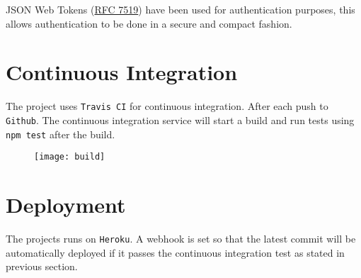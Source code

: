 \documentclass[a4paper]{article}
\begin{document}
JSON Web Tokens (\href{https://tools.ietf.org/html/rfc7519}{RFC 7519}) have
been used for authentication purposes, this allows authentication to be done in
a secure and compact fashion.

\section{Continuous Integration}

The project uses \texttt{Travis CI} for continuous integration. After each push
to \texttt{Github}. The continuous integration service will start a build and
run tests using \texttt{npm test} after the build.
\begin{figure}
  \texttt{[image: build]}
  \label{fig:boat1}
\end{figure}

\section{Deployment}

The projects runs on \texttt{Heroku}. A webhook is set so that the latest
commit will be automatically deployed if it passes the continuous integration
test as stated in previous section.
\end{document}
